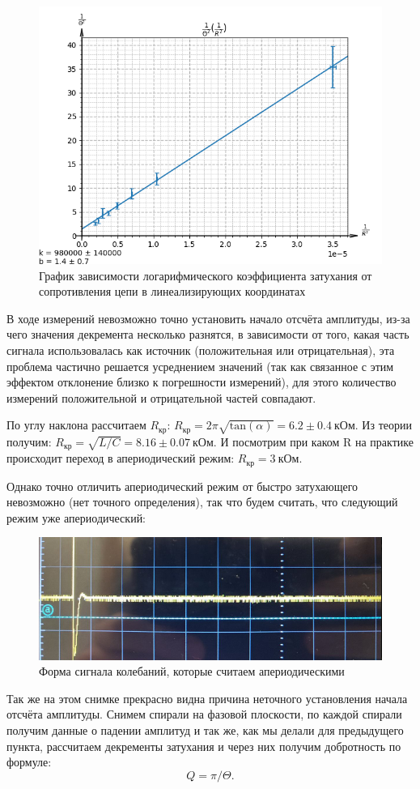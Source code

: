 \documentclass[a4paper,12pt]{extarticle}
\begin{document}
\begin{figure}[h!]
    \centering
    \includegraphics[width=0.8\linewidth]{th(r).png}
    \caption{График зависимости логарифмического коэффициента затухания от сопротивления цепи в линеализирующих координатах}
\end{figure}
В ходе измерений невозможно точно установить начало отсчёта амплитуды, из-за чего значения декремента несколько разнятся, в зависимости от того, какая часть сигнала использовалась как источник (положительная или отрицательная), эта проблема частично решается усреднением значений (так как связанное с этим эффектом отклонение близко к погрешности измерений), для этого количество измерений положительной и отрицательной частей совпадают.

По углу наклона рассчитаем $R_\text{кр}$: $R_\text{кр} = 2 \pi \sqrt{\text{tan}(\alpha)} = 6.2 \pm 0.4 \ \text{кОм}.$ Из теории получим: $R_\text{кр} = \sqrt{L/C} = 8.16 \pm 0.07 \ \text{кОм}.$ И посмотрим при каком R на практике происходит переход в апериодический режим:
$R_\text{кр} = 3 \ \text{кОм}.$

Однако точно отличить апериодический режим от быстро затухающего невозможно (нет точного определения), так что будем считать, что следующий режим уже апериодический:
\begin{figure}[h!]
    \centering
    \includegraphics[width=0.8\linewidth]{aperiod.png}
    \caption{Форма сигнала колебаний, которые считаем апериодическими}
\end{figure}
Так же на этом снимке прекрасно видна причина неточного установления начала отсчёта амплитуды.
Снимем спирали на фазовой плоскости, по каждой спирали получим данные о падении амплитуд и так же, как мы делали для предыдущего пункта, рассчитаем декременты затухания и через них получим добротность по формуле:
\begin{equation}
    Q = \pi / \Theta.
\end{equation}
\end{document}
